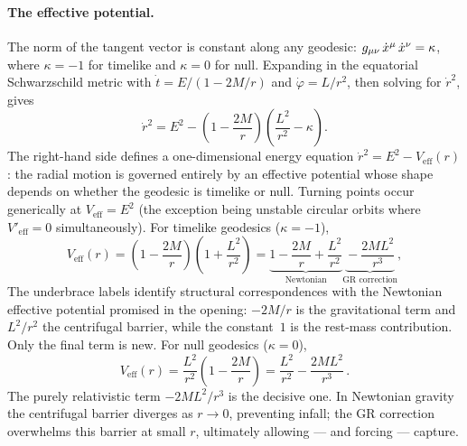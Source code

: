 \paragraph{The effective potential.}

The norm of the tangent vector is constant along any geodesic:
$g_{\mu\nu}\,\dot{x}^\mu\,\dot{x}^\nu = \kappa$, where $\kappa = -1$
for timelike and $\kappa = 0$ for null.  Expanding in the equatorial
Schwarzschild metric with $\dot{t} = E/(1-2M/r)$ and
$\dot{\varphi} = L/r^2$, then solving for $\dot{r}^2$, gives
%
\begin{equation}
  \dot{r}^2 = E^2
    - \left(1 - \frac{2M}{r}\right)
      \!\left(\frac{L^2}{r^2} - \kappa\right) .
  \label{eq:schw-radial}
\end{equation}
%
The right-hand side defines a one-dimensional energy equation
$\dot{r}^2 = E^2 - V_{\text{eff}}(r)$: the radial motion is governed
entirely by an effective potential whose shape depends on whether the
geodesic is timelike or null.  Turning points occur generically at
$V_{\text{eff}} = E^2$ (the exception being unstable circular orbits
where $V'_{\text{eff}} = 0$ simultaneously).
For timelike geodesics
($\kappa = -1$),
%
\begin{equation}
  V_{\text{eff}}(r) = \left(1 - \frac{2M}{r}\right)
    \!\left(1 + \frac{L^2}{r^2}\right)
  = \underbrace{1 - \frac{2M}{r} + \frac{L^2}{r^2}}_{\text{Newtonian}}
    \underbrace{{} - \frac{2ML^2}{r^3}}_{\text{GR correction}} ,
  \label{eq:veff-timelike}
\end{equation}
%
The underbrace labels identify structural correspondences with the
Newtonian effective potential promised in the opening: $-2M/r$ is the
gravitational term and $L^2/r^2$ the centrifugal barrier, while the
constant~$1$ is the rest-mass contribution.  Only the final term is
new.  For null geodesics ($\kappa = 0$),
%
\begin{equation}
  V_{\text{eff}}(r) = \frac{L^2}{r^2}\!\left(1 - \frac{2M}{r}\right)
  = \frac{L^2}{r^2} - \frac{2ML^2}{r^3} \,.
  \label{eq:veff-null}
\end{equation}
%
The purely relativistic term $-2ML^2/r^3$ is the decisive one.  In
Newtonian gravity the centrifugal barrier diverges as $r \to 0$,
preventing infall; the GR correction overwhelms this barrier at small
$r$, ultimately allowing --- and forcing --- capture.

